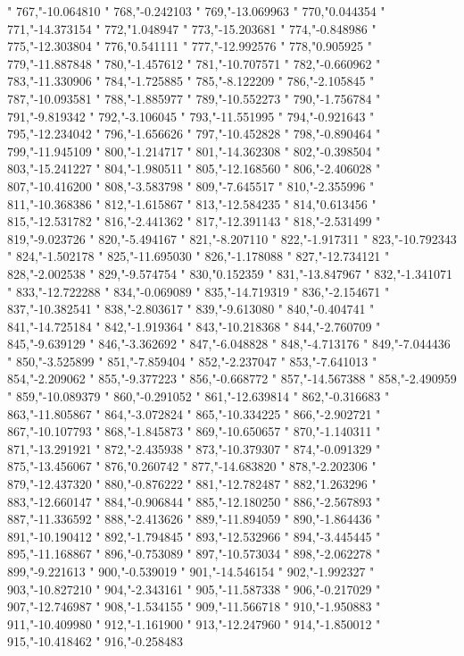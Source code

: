 "
767,"-10.064810
"
768,"-0.242103
"
769,"-13.069963
"
770,"0.044354
"
771,"-14.373154
"
772,"1.048947
"
773,"-15.203681
"
774,"-0.848986
"
775,"-12.303804
"
776,"0.541111
"
777,"-12.992576
"
778,"0.905925
"
779,"-11.887848
"
780,"-1.457612
"
781,"-10.707571
"
782,"-0.660962
"
783,"-11.330906
"
784,"-1.725885
"
785,"-8.122209
"
786,"-2.105845
"
787,"-10.093581
"
788,"-1.885977
"
789,"-10.552273
"
790,"-1.756784
"
791,"-9.819342
"
792,"-3.106045
"
793,"-11.551995
"
794,"-0.921643
"
795,"-12.234042
"
796,"-1.656626
"
797,"-10.452828
"
798,"-0.890464
"
799,"-11.945109
"
800,"-1.214717
"
801,"-14.362308
"
802,"-0.398504
"
803,"-15.241227
"
804,"-1.980511
"
805,"-12.168560
"
806,"-2.406028
"
807,"-10.416200
"
808,"-3.583798
"
809,"-7.645517
"
810,"-2.355996
"
811,"-10.368386
"
812,"-1.615867
"
813,"-12.584235
"
814,"0.613456
"
815,"-12.531782
"
816,"-2.441362
"
817,"-12.391143
"
818,"-2.531499
"
819,"-9.023726
"
820,"-5.494167
"
821,"-8.207110
"
822,"-1.917311
"
823,"-10.792343
"
824,"-1.502178
"
825,"-11.695030
"
826,"-1.178088
"
827,"-12.734121
"
828,"-2.002538
"
829,"-9.574754
"
830,"0.152359
"
831,"-13.847967
"
832,"-1.341071
"
833,"-12.722288
"
834,"-0.069089
"
835,"-14.719319
"
836,"-2.154671
"
837,"-10.382541
"
838,"-2.803617
"
839,"-9.613080
"
840,"-0.404741
"
841,"-14.725184
"
842,"-1.919364
"
843,"-10.218368
"
844,"-2.760709
"
845,"-9.639129
"
846,"-3.362692
"
847,"-6.048828
"
848,"-4.713176
"
849,"-7.044436
"
850,"-3.525899
"
851,"-7.859404
"
852,"-2.237047
"
853,"-7.641013
"
854,"-2.209062
"
855,"-9.377223
"
856,"-0.668772
"
857,"-14.567388
"
858,"-2.490959
"
859,"-10.089379
"
860,"-0.291052
"
861,"-12.639814
"
862,"-0.316683
"
863,"-11.805867
"
864,"-3.072824
"
865,"-10.334225
"
866,"-2.902721
"
867,"-10.107793
"
868,"-1.845873
"
869,"-10.650657
"
870,"-1.140311
"
871,"-13.291921
"
872,"-2.435938
"
873,"-10.379307
"
874,"-0.091329
"
875,"-13.456067
"
876,"0.260742
"
877,"-14.683820
"
878,"-2.202306
"
879,"-12.437320
"
880,"-0.876222
"
881,"-12.782487
"
882,"1.263296
"
883,"-12.660147
"
884,"-0.906844
"
885,"-12.180250
"
886,"-2.567893
"
887,"-11.336592
"
888,"-2.413626
"
889,"-11.894059
"
890,"-1.864436
"
891,"-10.190412
"
892,"-1.794845
"
893,"-12.532966
"
894,"-3.445445
"
895,"-11.168867
"
896,"-0.753089
"
897,"-10.573034
"
898,"-2.062278
"
899,"-9.221613
"
900,"-0.539019
"
901,"-14.546154
"
902,"-1.992327
"
903,"-10.827210
"
904,"-2.343161
"
905,"-11.587338
"
906,"-0.217029
"
907,"-12.746987
"
908,"-1.534155
"
909,"-11.566718
"
910,"-1.950883
"
911,"-10.409980
"
912,"-1.161900
"
913,"-12.247960
"
914,"-1.850012
"
915,"-10.418462
"
916,"-0.258483
